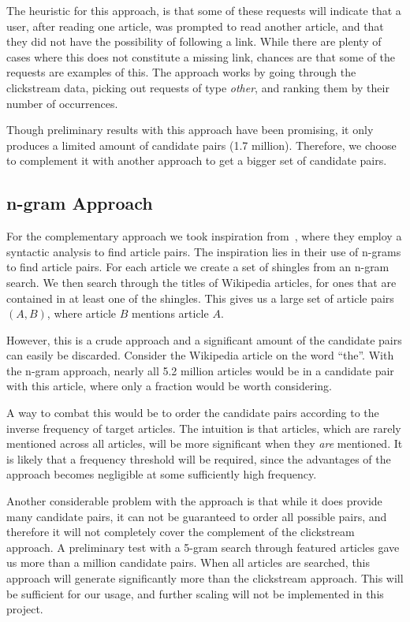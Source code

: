 The heuristic for this approach, is that some of these requests will indicate that a user, after reading one article, was prompted to read another article, and that they did not have the possibility of following a link. While there are plenty of cases where this does not constitute a missing link, chances are that some of the requests are examples of this. The approach works by going through the clickstream data, picking out requests of type \emph{other}, and ranking them by their number of occurrences.

Though preliminary results with this approach have been promising, it only produces a limited amount of candidate pairs (1.7 million). Therefore, we choose to complement it with another approach to get a bigger set of candidate pairs.

\subsection{n-gram Approach}

For the complementary approach we took inspiration from~\cite{milne2008learning}, where they employ a syntactic analysis to find article pairs. The inspiration lies in their use of n-grams to find article pairs. For each article we create a set of shingles from an n-gram search. We then search through the titles of Wikipedia articles, for ones that are contained in at least one of the shingles. This gives us a large set of article pairs $(A,B)$, where article $B$ mentions article $A$.

However, this is a crude approach and a significant amount of the candidate pairs can easily be discarded. Consider the Wikipedia article on the word \enquote{the}. With the n-gram approach, nearly all 5.2 million articles would be in a candidate pair with this article, where only a fraction would be worth considering.

A way to combat this would be to order the candidate pairs according to the inverse frequency of target articles. The intuition is that articles, which are rarely mentioned across all articles, will be more significant when they \emph{are} mentioned. It is likely that a frequency threshold will be required, since the advantages of the approach becomes negligible at some sufficiently high frequency.

Another considerable problem with the approach is that while it does provide many candidate pairs, it can not be guaranteed to order all possible pairs, and therefore it will not completely cover the complement of the clickstream approach. A preliminary test with a 5-gram search through featured articles gave us more than a million candidate pairs. When all articles are searched, this approach will generate significantly more than the clickstream approach. This will be sufficient for our usage, and further scaling will not be implemented in this project.


